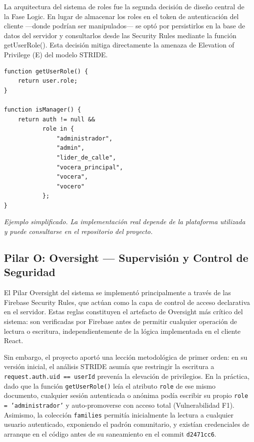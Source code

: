 \documentclass[14pt,a4paper,oneside]{extbook}
\begin{document}
La arquitectura del sistema de roles fue la segunda decisión de diseño central de la Fase Logic. En lugar de almacenar los roles en el token de autenticación del cliente ---donde podrían ser manipulados--- se optó por persistirlos en la base de datos del servidor y consultarlos desde las Security Rules mediante la función getUserRole(). Esta decisión mitiga directamente la amenaza de Elevation of Privilege (E) del modelo STRIDE.


\begin{tcolorbox}[
    colback=primary!5,
    colframe=primary!30,
    arc=5pt,
    title=Ejemplo simplificado de validación de roles
]

\begin{verbatim}
function getUserRole() {
    return user.role;
}

function isManager() {
    return auth != null &&
           role in {
               "administrador",
               "admin",
               "lider_de_calle",
               "vocera_principal",
               "vocera",
               "vocero"
           };
}
\end{verbatim}

\smallskip
\textit{
Ejemplo simplificado. La implementación real depende
de la plataforma utilizada y puede consultarse en el repositorio del proyecto.
}

\end{tcolorbox}

\subsection{Pilar O: Oversight — Supervisión y Control de Seguridad}

El Pilar Oversight del sistema se implementó principalmente a través de las Firebase Security Rules, que actúan como la capa de control de acceso declarativa en el servidor. Estas reglas constituyen el artefacto de Oversight más crítico del sistema: son verificadas por Firebase antes de permitir cualquier operación de lectura o escritura, independientemente de la lógica implementada en el cliente React.

Sin embargo, el proyecto aportó una lección metodológica de primer orden: en su versión inicial, el análisis STRIDE asumía que restringir la escritura a \texttt{request.auth.uid == userId} prevenía la elevación de privilegios. En la práctica, dado que la función \texttt{getUserRole()} leía el atributo \texttt{role} de ese mismo documento, cualquier sesión autenticada o anónima podía escribir su propio \texttt{role = 'administrador'} y auto-promoverse con acceso total (Vulnerabilidad F1). Asimismo, la colección \texttt{families} permitía inicialmente la lectura a cualquier usuario autenticado, exponiendo el padrón comunitario, y existían credenciales de arranque en el código antes de su saneamiento en el commit \texttt{d2471cc6}.
\end{document}
